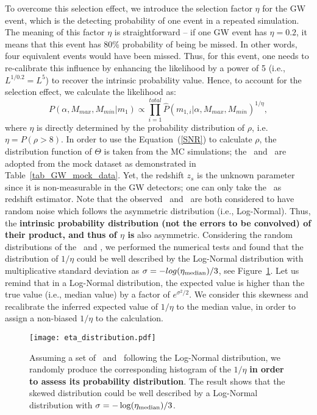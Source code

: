 \documentclass[twocolumn]{aastex62}
\begin{document}
To overcome this selection effect, we introduce the selection factor $\eta$ for the GW event, which is the detecting probability of one event in a repeated simulation. 
The meaning of this factor $\eta$ is straightforward -- if one GW event has $\eta=0.2$, it means that this event has 80\% probability of being be missed. In other words, four equivalent events would have been missed. Thus, for this event, one needs to re-calibrate this influence by enhancing the likelihood by a power of 5 (i.e., $L^{1/0.2} = L^5$) to recover the intrinsic probability value. Hence, to account for the selection effect, we calculate the likelihood as:
 \begin{equation} \label{equ_lik_sf}
 P(\alpha, M_{max}, M_{min}|m_{1}) \propto  \prod_{i=1}^{total} \hat{P}(m_{1,i}|\alpha, M_{max}, M_{min})^{1/\eta},
 \end{equation}
where $\eta$ is directly determined by the probability distribution of $\rho$, i.e. $\eta = P(\rho>8)$. In order to use the Equation~(\ref{SNR}) to calculate $\rho$, the distribution function of $\Theta$ is taken from the MC simulations; the \cmass\ and \dl\ are adopted from the mock dataset as demonstrated in Table~\ref{tab_GW_mock_data}. Yet, the redshift $z_s$ is the unknown parameter since it is non-measurable in the GW detectors; one can only take the \dl\ as redshift estimator.
Note that the observed \dl\ and \cmass\ are both considered to have random noise which follows the asymmetric distribution (i.e., Log-Normal). Thus, the {\bf intrinsic probability distribution (not the errors to be convolved) of their product, and thus of $\eta$ is} also asymmetric. Considering the random distributions of the \dl\ and \cmass, we performed the numerical tests and found that the distribution of $1/\eta$ could be well described by the Log-Normal distribution with multiplicative standard deviation as $\sigma=-log(\eta_{\rm median})/3$, see Figure~\ref{fig_eta}. Let us remind that in a Log-Normal distribution, the expected value is higher than the true value (i.e., median value) by a factor of $e^{\sigma^2/2}$.
We consider this skewness and recalibrate the inferred expected value of $1/\eta$ to the median value, in order to assign a non-biased $1/\eta$ to the calculation.

\begin{figure}%
\texttt{[image: eta\_distribution.pdf]}
\caption{
Assuming a set of \dl\ and \cmass\ following the Log-Normal distribution, we randomly produce the corresponding histogram of the $1/\eta$ {\bf in order to assess its probability distribution}. The result shows that the skewed distribution could be well described by a Log-Normal distribution with $\sigma = -\log(\eta_{\rm median})/3$.
}
\label{fig_eta}
\end{figure}
\end{document}
